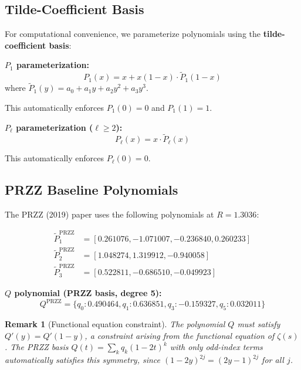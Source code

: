 \documentclass[11pt]{article}
\newtheorem{remark}{Remark}
\begin{document}
\subsection{Tilde-Coefficient Basis}

For computational convenience, we parameterize polynomials using the \textbf{tilde-coefficient basis}:

\textbf{$P_1$ parameterization:}
\begin{equation}
P_1(x) = x + x(1-x) \cdot \tilde{P}_1(1-x)
\end{equation}
where $\tilde{P}_1(y) = a_0 + a_1 y + a_2 y^2 + a_3 y^3$.

This automatically enforces $P_1(0) = 0$ and $P_1(1) = 1$.

\textbf{$P_\ell$ parameterization ($\ell \geq 2$):}
\begin{equation}
P_\ell(x) = x \cdot \tilde{P}_\ell(x)
\end{equation}

This automatically enforces $P_\ell(0) = 0$.

\subsection{PRZZ Baseline Polynomials}

The PRZZ (2019) paper uses the following polynomials at $R = 1.3036$:

\begin{align}
\tilde{P}_1^{\text{PRZZ}} &= [0.261076, -1.071007, -0.236840, 0.260233] \\
\tilde{P}_2^{\text{PRZZ}} &= [1.048274, 1.319912, -0.940058] \\
\tilde{P}_3^{\text{PRZZ}} &= [0.522811, -0.686510, -0.049923]
\end{align}

\textbf{$Q$ polynomial (PRZZ basis, degree 5):}
\begin{equation}
Q^{\text{PRZZ}} = \{q_0: 0.490464, q_1: 0.636851, q_3: -0.159327, q_5: 0.032011\}
\end{equation}

\begin{remark}[Functional equation constraint]
The polynomial $Q$ must satisfy $Q'(y) = Q'(1-y)$, a constraint arising from
the functional equation of $\zeta(s)$ \cite{Conrey1989,Farmer2025}. The PRZZ basis
$Q(t) = \sum_k q_k (1-2t)^k$ with only odd-index terms automatically satisfies
this symmetry, since $(1-2y)^{2j} = (2y-1)^{2j}$ for all $j$.
\end{remark}
\end{document}
